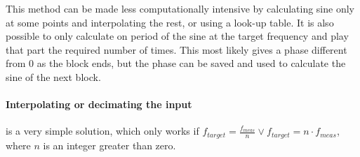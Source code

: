This method can be made less computationally intensive by calculating sine only at some points and interpolating the rest, or using a look-up table. It is also possible to only calculate on period of the sine at the target frequency and play that part the required number of times. This most likely gives a phase different from 0 as the block ends, but the phase can be saved and used to calculate the sine of the next block.

\paragraph{Interpolating or decimating the input} is a very simple solution, which only works if $f_{target}=\frac{f_{meas}}{n}\vee f_{target} =n\cdot f_{meas}$, where $n$ is an integer greater than zero.